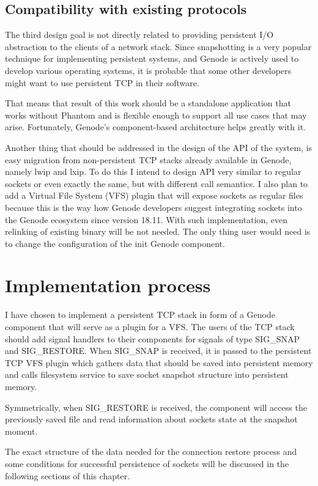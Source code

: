 \subsection {Compatibility with existing protocols}

The third design goal is not directly related to providing persistent I/O
abstraction to the clients of a network stack. Since snapshotting is a very
popular technique for implementing persistent systems, and Genode is actively
used to develop various operating systems, it is probable that some other
developers might want to use persistent TCP in their software.

That means that result of this work should be a standalone application that
works without Phantom and is flexible enough to support all use cases that may
arise. Fortunately, Genode's component-based architecture helps greatly with
it.

Another thing that should be addressed in the design of the API of the system,
is easy migration from non-persistent TCP stacks already available in Genode,
namely lwip and lxip. To do this I intend to design API very similar to regular
sockets or even exactly the same, but with different call semantics. I also
plan to add a Virtual File System (VFS) plugin that will expose sockets as
regular files because this is the way how Genode developers suggest
integrating sockets into the Genode ecosystem since version 18.11. With such
implementation, even relinking of existing binary will be not needed. The only
thing user would need is to change the configuration of the init Genode
component.

\section{Implementation process}

I have chosen to implement a persistent TCP stack in form of a Genode component
that will serve as a plugin for a VFS. The users of the TCP stack should add
signal handlers to their components for signals of type SIG\_SNAP and
SIG\_RESTORE. When SIG\_SNAP is received, it is passed to the persistent TCP VFS
plugin which gathers data that should be saved into persistent memory and calls
filesystem service to save socket snapshot structure into persistent memory.

Symmetrically, when SIG\_RESTORE is received, the component will access the
previously saved file and read information about sockets state at the snapshot
moment.

The exact structure of the data needed for the connection restore process and
some conditions for successful persistence of sockets will be discussed in the
following sections of this chapter.
